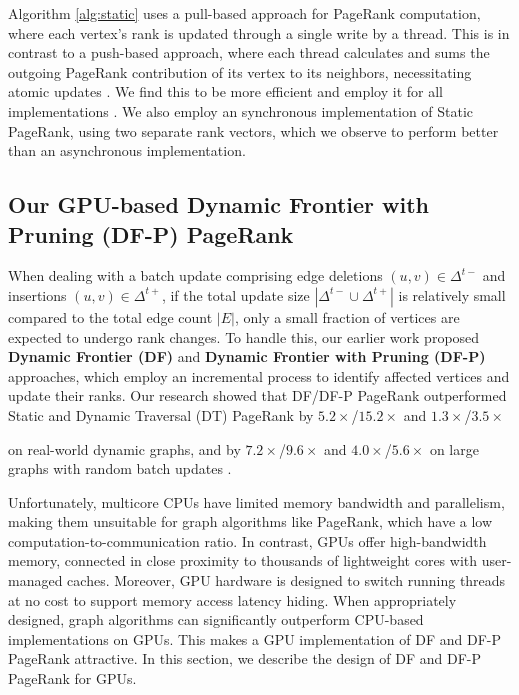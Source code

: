 Algorithm \ref{alg:static} uses a pull-based approach for PageRank computation, where each vertex's rank is updated through a single write by a thread. This is in contrast to a push-based approach, where each thread calculates and sums the outgoing PageRank contribution of its vertex to its neighbors, necessitating atomic updates \cite{verstraaten2015quantifying}. We find this to be more efficient and employ it for all implementations \cite{sahu2024df}. We also employ an synchronous implementation of Static PageRank, using two separate rank vectors, which we observe to perform better than an asynchronous implementation.






\subsection{Our GPU-based Dynamic Frontier with Pruning (DF-P) PageRank}
\label{sec:frontier}

When dealing with a batch update comprising edge deletions $(u, v) \in \Delta^{t-}$ and insertions $(u, v) \in \Delta^{t+}$, if the total update size $|\Delta^{t-} \cup \Delta^{t+}|$ is relatively small compared to the total edge count $|E|$, only a small fraction of vertices are expected to undergo rank changes. To handle this, our earlier work proposed \textbf{Dynamic Frontier (DF)} and \textbf{Dynamic Frontier with Pruning (DF-P)} approaches, which employ an incremental process to identify affected vertices and update their ranks. Our research showed that DF/DF-P PageRank outperformed Static and Dynamic Traversal (DT) PageRank by $5.2\times$/$15.2\times$ and $1.3\times$/$3.5\times$ on real-world dynamic graphs, and by $7.2\times$/$9.6\times$ and $4.0\times$/$5.6\times$ on large graphs with random batch updates \cite{sahu2024df}.

Unfortunately, multicore CPUs have limited memory bandwidth and parallelism, making them unsuitable for graph algorithms like PageRank, which have a low computation-to-communication ratio. In contrast, GPUs offer high-bandwidth memory, connected in close proximity to thousands of lightweight cores with user-managed caches. Moreover, GPU hardware is designed to switch running threads at no cost to support memory access latency hiding. When appropriately designed, graph algorithms can significantly outperform CPU-based implementations on GPUs. This makes a GPU implementation of DF and DF-P PageRank attractive. In this section, we describe the design of DF and DF-P PageRank for GPUs.

